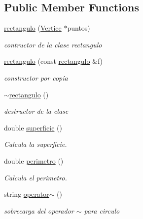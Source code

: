 \subsection*{Public Member Functions}
\begin{DoxyCompactItemize}
\item 
\hyperlink{classrectangulo_aa785cc2d5bd4cbae7dab1912afba62a7}{rectangulo} (\hyperlink{class_vertice}{Vertice} $\ast$puntos)
\begin{DoxyCompactList}\small\item\em contructor de la clase rectangulo \end{DoxyCompactList}\item 
\hyperlink{classrectangulo_a430bc3e43d0d3959dc0fa6920a57c700}{rectangulo} (const \hyperlink{classrectangulo}{rectangulo} \&f)
\begin{DoxyCompactList}\small\item\em constructor por copia \end{DoxyCompactList}\item 
\mbox{\label{classrectangulo_aba192e636fe037aaf0ccc294e4570b29}} 
\hyperlink{classrectangulo_aba192e636fe037aaf0ccc294e4570b29}{$\sim$rectangulo} ()
\begin{DoxyCompactList}\small\item\em destructor de la clase \end{DoxyCompactList}\item 
\mbox{\label{classrectangulo_ab0db7c753485200cf2577532af506426}} 
double \hyperlink{classrectangulo_ab0db7c753485200cf2577532af506426}{superficie} ()
\begin{DoxyCompactList}\small\item\em Calcula la superficie. \end{DoxyCompactList}\item 
\mbox{\label{classrectangulo_a23a8d0d8a593f80776b4629c6dc435e0}} 
double \hyperlink{classrectangulo_a23a8d0d8a593f80776b4629c6dc435e0}{perimetro} ()
\begin{DoxyCompactList}\small\item\em Calcula el perimetro. \end{DoxyCompactList}\item 
\mbox{\label{classrectangulo_a72992eaf78fb4834cbe2774604a70a0d}} 
string \hyperlink{classrectangulo_a72992eaf78fb4834cbe2774604a70a0d}{operator$\sim$} ()
\begin{DoxyCompactList}\small\item\em sobrecarga del operador $\sim$ para circulo \end{DoxyCompactList}\end{DoxyCompactItemize}
